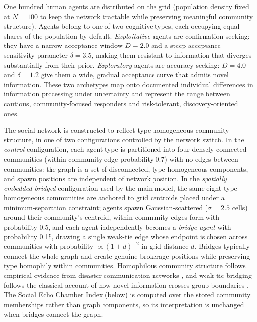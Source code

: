 \documentclass[sn-apacite]{sn-jnl}
\begin{document}
One hundred human agents are distributed on the grid (population density fixed at $N = 100$ to keep the network tractable while preserving meaningful community structure). Agents belong to one of two cognitive types, each occupying equal shares of the population by default. \emph{Exploitative} agents are confirmation-seeking: they have a narrow acceptance window $D = 2.0$ and a steep acceptance-sensitivity parameter $\delta = 3.5$, making them resistant to information that diverges substantially from their prior. \emph{Exploratory} agents are accuracy-seeking: $D = 4.0$ and $\delta = 1.2$ give them a wide, gradual acceptance curve that admits novel information. These two archetypes map onto documented individual differences in information processing under uncertainty \citep{hertwig2016homo,march1991exploration} %
and represent the range between cautious, community-focused responders and risk-tolerant, discovery-oriented ones.

The social network is constructed to reflect type-homogeneous community structure, in one of two configurations controlled by the network switch. In the \emph{control} configuration, each agent type is partitioned into four densely connected communities (within-community edge probability 0.7) with no edges between communities: the graph is a set of disconnected, type-homogeneous components, and spawn positions are independent of network position. In the \emph{spatially embedded bridged} configuration used by the main model, the same eight type-homogeneous communities are anchored to grid centroids placed under a minimum-separation constraint; agents spawn Gaussian-scattered ($\sigma = 2.5$ cells) around their community's centroid, within-community edges form with probability 0.5, and each agent independently becomes a \emph{bridge agent} with probability 0.15, drawing a single weak-tie edge whose endpoint is chosen across communities with probability $\propto (1 + d)^{-2}$ in grid distance $d$. Bridges typically connect the whole graph and create genuine brokerage positions while preserving type homophily within communities. Homophilous community structure follows empirical evidence from disaster communication networks \citep{bruns2012qldfloods,sutton2008backchannels}, %
and weak-tie bridging follows the classical account of how novel information crosses group boundaries \citep{granovetter1973strength}. The Social Echo Chamber Index (below) is computed over the stored community memberships rather than graph components, so its interpretation is unchanged when bridges connect the graph.
\end{document}
